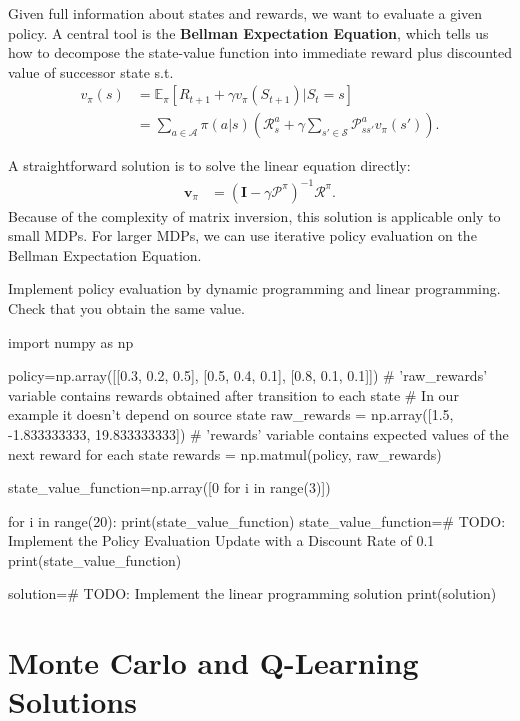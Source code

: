 Given full information about states and rewards, we want to evaluate a given policy. A central tool is the \textbf{Bellman Expectation Equation}, which tells us how to decompose the state-value function into immediate reward plus discounted value of successor state s.t.
\begin{align*}
    v_{\pi}(s) & = \mathbb{E}_{\pi}[R_{t+1} + \gamma v_{\pi}(S_{t+1}) | S_t = s]\\
    & = \sum_{a \in \mathcal{A}} \pi(a|s) \left( \mathcal{R}_s^a + \gamma \sum_{s' \in \mathcal{S}} \mathcal{P}_{ss'}^a v_{\pi}(s') \right).
\end{align*}

\noindent A straightforward solution is to solve the linear equation directly:
\begin{align*}
    \boldsymbol{v}_{\pi} & = (\boldsymbol{I} -  \gamma \boldsymbol{\mathcal{P}}^{\pi})^{-1} \boldsymbol{\mathcal{R}}^{\pi}.
\end{align*}
Because of the complexity of matrix inversion, this solution is applicable only to small MDPs. For larger MDPs, we can use iterative policy evaluation on the Bellman Expectation Equation.

\begin{exercise}
\label{exercise:PolicyEvaluation}
Implement policy evaluation by dynamic programming and linear programming. Check that you obtain the same value.

\begin{python}
import numpy as np

policy=np.array([[0.3, 0.2, 0.5], [0.5, 0.4, 0.1], [0.8, 0.1, 0.1]])
# 'raw_rewards' variable contains rewards obtained after transition to each state
# In our example it doesn't depend on source state
raw_rewards = np.array([1.5, -1.833333333, 19.833333333])
# 'rewards' variable contains expected values of the next reward for each state
rewards = np.matmul(policy, raw_rewards)

state_value_function=np.array([0 for i in range(3)])

for i in range(20):
    print(state_value_function)
    state_value_function=# TODO: Implement the Policy Evaluation Update with a Discount Rate of 0.1
print(state_value_function)

solution=# TODO: Implement the linear programming solution
print(solution)
\end{python}
\end{exercise}

\section{Monte Carlo and Q-Learning Solutions}

